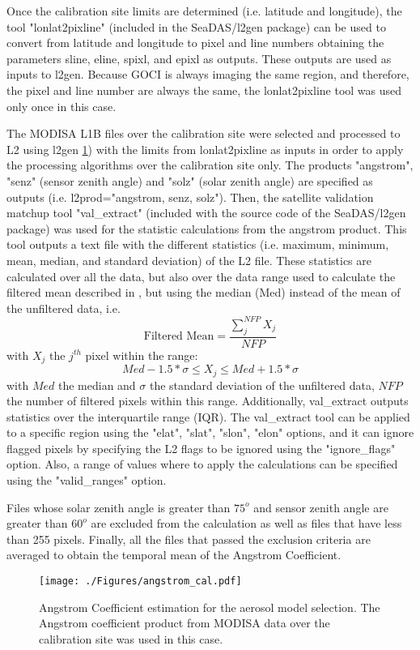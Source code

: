 \documentclass[10pt]{article}
\begin{document}
Once the calibration site limits are determined (i.e. latitude and longitude), the tool "lonlat2pixline" (included in the SeaDAS/l2gen package) can be used to convert from latitude and longitude to pixel and line numbers obtaining the parameters sline, eline, spixl, and epixl as outputs. These outputs are used as inputs to l2gen. Because GOCI is always imaging the same region, and therefore, the pixel and line number are always the same, the lonlat2pixline tool was used only once in this case.

The MODISA L1B files over the calibration site were selected and processed to L2 using l2gen \ref{fig:angstrom_cal}) with the limits from lonlat2pixline as inputs in order to apply the processing algorithms over the calibration site only. The products "angstrom", "senz" (sensor zenith angle) and "solz" (solar zenith angle) are specified as outputs (i.e. l2prod="angstrom, senz, solz"). Then, the satellite validation matchup tool "val\_extract" (included with the source code of the SeaDAS/l2gen package) was used for the statistic calculations from the angstrom product. This tool outputs a text file with the different statistics (i.e. maximum, minimum, mean, median, and standard deviation) of the L2 file. These statistics are calculated over all the data, but also over the data range used to calculate the filtered mean described in \cite{Bailey2006}, but using the median (Med) instead of the mean of the unfiltered data, i.e.
\begin{equation}
	\text{Filtered Mean}=\frac{\displaystyle \sum_j^{NFP}X_j}{NFP}
\end{equation}
with $X_j$ the $j^{th}$ pixel within the range:
\begin{equation}
	Med-1.5*\sigma\leq X_j\leq Med+1.5*\sigma
\end{equation}
with $Med$ the median and $\sigma$ the standard deviation of the unfiltered data, $NFP$ the number of filtered pixels within this range. Additionally, val\_extract outputs statistics over the interquartile range (IQR). The val\_extract tool can be applied to a specific region using the "elat", "slat", "slon", "elon" options, and it can ignore flagged pixels by specifying the L2 flags to be ignored using the "ignore\_flags" option. Also, a range of values where to apply the calculations can be specified using the "valid\_ranges" option. 

Files whose solar zenith angle is greater than $75^o$ and sensor zenith angle are greater than $60^o$ are excluded from the calculation as well as files that have less than 255 pixels. Finally, all the files that passed the exclusion criteria are averaged to obtain the temporal mean of the Angstrom Coefficient. 
\begin{figure}[H]
  \centering
  \texttt{[image: ./Figures/angstrom\_cal.pdf]}
    \caption{Angstrom Coefficient estimation for the aerosol model selection. The Angstrom coefficient product from MODISA data over the calibration site was used in this case.  \label{fig:angstrom_cal}} 
\end{figure}
\end{document}
